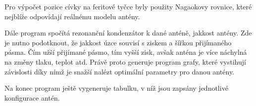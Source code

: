 Pro výpočet pozice cívky na feritové tyčce byly použity Nagaokovy rovnice, které nejblíže
odpovídají reálnému modelu antény.

Dále program spočítá rezonanční kondenzátor k dané anténě, jakkost antény. Zde je nutno
podotknout, že jakkost úzce souvisí s ziskem a šířkou přijímaného pásma. Čím užší
přijímané pásmo, tím vyšší zisk, avšak anténa je více náchylná na změny tlaku, teplot atd. Právě proto generuje program grafy, které vystihují závislosti díky nímž je snažší
nalézt optimální parametry pro danou antény.

Na konec program ještě vygeneruje tabulku, v níž jsou zapsány jednotlivé konfigurace
antén.


